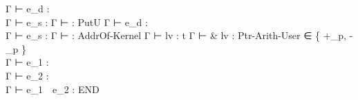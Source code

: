 {{              { Γ ⊢ e_d : 
             \\ Γ ⊢ e_s : 
              }
              { Γ ⊢  : \tInt }
    }
    {PutU}{ 
              { Γ ⊢ e_d : 
             \\ Γ ⊢ e_s : 
              }
              { Γ ⊢  : \tInt }
    }
    {AddrOf-Kernel}{ 
                       { Γ ⊢ lv : t }
                       { Γ ⊢ \& lv :  }
    }
    {Ptr-Arith-User}{ 
                         { \opbin ∈ \{ +_p, -_p \} \\
                           Γ ⊢ e_1 :  \\
                           Γ ⊢ e_2 : \tInt \\
                         }
                         { Γ ⊢ e_1~\opbin~e_2 :  }
    }
    {END}
}

